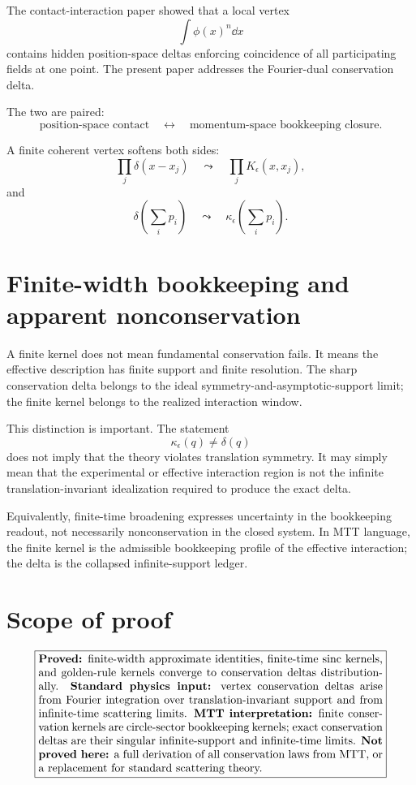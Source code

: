 \documentclass[11pt]{article}
\begin{document}
The contact-interaction paper showed that a local vertex
\[
\int\phi(x)^n\dd x
\]
contains hidden position-space deltas enforcing coincidence of all participating fields at one point.  The present paper addresses the Fourier-dual conservation delta.

The two are paired:
\[
\text{position-space contact}
\quad\longleftrightarrow\quad
\text{momentum-space bookkeeping closure}.
\]

A finite coherent vertex softens both sides:
\[
\prod_j\delta(x-x_j)
\quad\leadsto\quad
\prod_jK_\epsilon(x,x_j),
\]
and
\[
\delta\!\left(\sum_i p_i\right)
\quad\leadsto\quad
\kappa_\epsilon\!\left(\sum_i p_i\right).
\]

\section{Finite-width bookkeeping and apparent nonconservation}

A finite kernel does not mean fundamental conservation fails.  It means the effective description has finite support and finite resolution.  The sharp conservation delta belongs to the ideal symmetry-and-asymptotic-support limit; the finite kernel belongs to the realized interaction window.

This distinction is important.  The statement
\[
\kappa_\epsilon(q)\neq\delta(q)
\]
does not imply that the theory violates translation symmetry.  It may simply mean that the experimental or effective interaction region is not the infinite translation-invariant idealization required to produce the exact delta.

Equivalently, finite-time broadening expresses uncertainty in the bookkeeping readout, not necessarily nonconservation in the closed system.  In MTT language, the finite kernel is the admissible bookkeeping profile of the effective interaction; the delta is the collapsed infinite-support ledger.

\section{Scope of proof}

\[
\boxed{
\begin{minipage}{0.88\linewidth}
\textbf{Proved:} finite-width approximate identities, finite-time sinc kernels, and golden-rule kernels converge to conservation deltas distributionally.

\textbf{Standard physics input:} vertex conservation deltas arise from Fourier integration over translation-invariant support and from infinite-time scattering limits.

\textbf{MTT interpretation:} finite conservation kernels are circle-sector bookkeeping kernels; exact conservation deltas are their singular infinite-support and infinite-time limits.

\textbf{Not proved here:} a full derivation of all conservation laws from MTT, or a replacement for standard scattering theory.
\end{minipage}
}
\]
\end{document}
